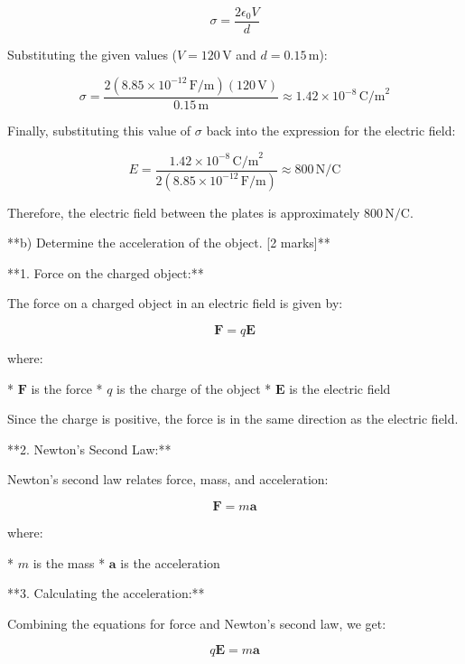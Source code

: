 \documentclass{article}
\begin{document}
\begin{equation*}
\sigma = \frac{2 \epsilon_0 V}{d}
\end{equation*}

Substituting the given values ($V = 120 \, \text{V}$ and $d = 0.15 \, \text{m}$):

\begin{equation*}
\sigma = \frac{2 (8.85 \times 10^{-12} \, \text{F/m})(120 \, \text{V})}{0.15 \, \text{m}} \approx 1.42 \times 10^{-8} \, \text{C/m}^2
\end{equation*}

Finally, substituting this value of $\sigma$ back into the expression for the electric field:

\begin{equation*}
E = \frac{1.42 \times 10^{-8} \, \text{C/m}^2}{2 (8.85 \times 10^{-12} \, \text{F/m})} \approx 800 \, \text{N/C}
\end{equation*}

Therefore, the electric field between the plates is approximately $800 \, \text{N/C}$.


**b) Determine the acceleration of the object. [2 marks]**

**1. Force on the charged object:**

The force on a charged object in an electric field is given by:

\begin{equation*}
\mathbf{F} = q\mathbf{E}
\end{equation*}

where:

* $\mathbf{F}$ is the force 
* $q$ is the charge of the object
* $\mathbf{E}$ is the electric field

Since the charge is positive, the force is in the same direction as the electric field.

**2. Newton's Second Law:**

Newton's second law relates force, mass, and acceleration:

\begin{equation*}
\mathbf{F} = m\mathbf{a}
\end{equation*}

where:

* $m$ is the mass
* $\mathbf{a}$ is the acceleration

**3. Calculating the acceleration:**

Combining the equations for force and Newton's second law, we get:

\begin{equation*}
q\mathbf{E} = m\mathbf{a}
\end{equation*}
\end{document}

